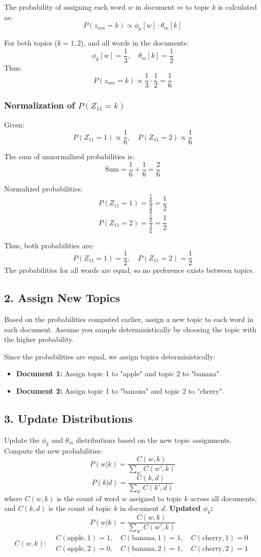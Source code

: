 \documentclass{article}
\begin{document}
The probability of assigning each word \( w \) in document \( m \) to topic \( k \) is calculated as:
\[
P(z_{mn} = k) \propto \phi_k[w] \cdot \theta_m[k]
\]

For both topics (\( k = 1, 2 \)), and all words in the documents:
\[
\phi_k[w] = \frac{1}{3}, \quad \theta_m[k] = \frac{1}{2}
\]
Thus:
\[
P(z_{mn} = k) \propto \frac{1}{3} \cdot \frac{1}{2} = \frac{1}{6}
\]

\subsubsection*{Normalization of \( P(Z_{11} = k) \)}

Given:
\[
P(Z_{11} = 1) \propto \frac{1}{6}, \quad P(Z_{11} = 2) \propto \frac{1}{6}
\]

The sum of unnormalized probabilities is:
\[
\text{Sum} = \frac{1}{6} + \frac{1}{6} = \frac{2}{6}
\]

Normalized probabilities:
\[
P(Z_{11} = 1) = \frac{\frac{1}{6}}{\frac{2}{6}} = \frac{1}{2}
\]
\[
P(Z_{11} = 2) = \frac{\frac{1}{6}}{\frac{2}{6}} = \frac{1}{2}
\]

Thus, both probabilities are:
\[
P(Z_{11} = 1) = \frac{1}{2}, \quad P(Z_{11} = 2) = \frac{1}{2}
\]
The probabilities for all words are equal, so no preference exists between topics.

\subsection*{2. Assign New Topics}
Based on the probabilities computed earlier, assign a new topic to each word in each document. Assume you sample deterministically by choosing the topic with the higher probability.

Since the probabilities are equal, we assign topics deterministically:
\begin{itemize}
    \item \textbf{Document 1:} Assign topic 1 to "apple" and topic 2 to "banana".
    \item \textbf{Document 2:} Assign topic 1 to "banana" and topic 2 to "cherry".
\end{itemize}

\subsection*{3. Update Distributions}
Update the $\phi_k$ and $\theta_m$ distributions based on the new topic assignments. Compute the new probabilities:
\[
P(w|k) = \frac{C(w, k)}{\sum_{w'} C(w', k)}
\]
\[
P(k|d) = \frac{C(k, d)}{\sum_{k'} C(k', d)}
\]
where $C(w, k)$ is the count of word $w$ assigned to topic $k$ across all documents, and $C(k, d)$ is the count of topic $k$ in document $d$.
\textbf{Updated \( \phi_k \):}
\[
P(w|k) = \frac{C(w, k)}{\sum_{w'} C(w', k)}
\]
\[
C(w, k):
\begin{aligned}
    &C(\text{apple}, 1) = 1, \quad C(\text{banana}, 1) = 1, \quad C(\text{cherry}, 1) = 0 \\
    &C(\text{apple}, 2) = 0, \quad C(\text{banana}, 2) = 1, \quad C(\text{cherry}, 2) = 1
\end{aligned}
\]
\end{document}
